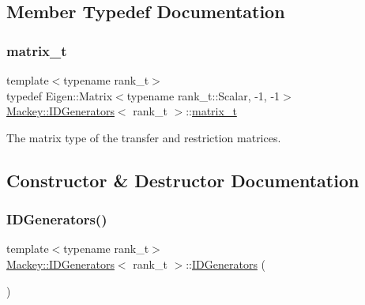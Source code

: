 \subsection{Member Typedef Documentation}
\mbox{\label{classMackey_1_1IDGenerators_a6b4c91c53aa7fe61ae93a716e891832f}} 
\subsubsection{\texorpdfstring{matrix\+\_\+t}{matrix\_t}}
{\footnotesize\ttfamily template$<$typename rank\+\_\+t$>$ \\
typedef Eigen\+::\+Matrix$<$typename rank\+\_\+t\+::\+Scalar, -\/1, -\/1$>$ \hyperlink{classMackey_1_1IDGenerators}{Mackey\+::\+I\+D\+Generators}$<$ rank\+\_\+t $>$\+::\hyperlink{classMackey_1_1IDGenerators_a6b4c91c53aa7fe61ae93a716e891832f}{matrix\+\_\+t}}



The matrix type of the transfer and restriction matrices. 



\subsection{Constructor \& Destructor Documentation}
\mbox{\label{classMackey_1_1IDGenerators_ad4e041defebc49fb90c1e7d78b066cdf}} 
\subsubsection{\texorpdfstring{I\+D\+Generators()}{IDGenerators()}}
{\footnotesize\ttfamily template$<$typename rank\+\_\+t$>$ \\
\hyperlink{classMackey_1_1IDGenerators}{Mackey\+::\+I\+D\+Generators}$<$ rank\+\_\+t $>$\+::\hyperlink{classMackey_1_1IDGenerators}{I\+D\+Generators} (\begin{DoxyParamCaption}{ }\end{DoxyParamCaption})\hspace{0.3cm}{\ttfamily [inline]}}



